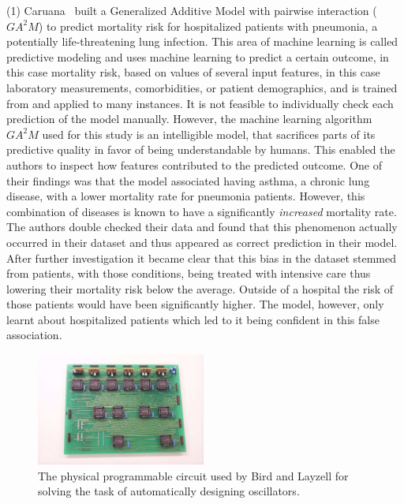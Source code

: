 \par \noindent (1)
Caruana~\etal\cite{Caruana:2015:IMH:2783258.2788613} built a Generalized Additive Model with pairwise interaction ($GA^2M$) to predict mortality risk for hospitalized patients with pneumonia, a potentially life-threatening lung infection. This area of machine learning is called predictive modeling and uses machine learning to predict a certain outcome, in this case mortality risk, based on values of several input features, in this case laboratory measurements, comorbidities, or patient demographics, and is trained from and applied to many instances. It is not feasible to individually check each prediction of the model manually. However, the machine learning algorithm $GA^2M$ used for this study is an intelligible model, that sacrifices parts of its predictive quality in favor of being understandable by humans. This enabled the authors to inspect how features contributed to the predicted outcome. One of their findings was that the model associated having asthma, a chronic lung disease, with a lower mortality rate for pneumonia patients. However, this combination of diseases is known to have a significantly \emph{increased} mortality rate. The authors double checked their data and found that this phenomenon actually occurred in their dataset and thus appeared as correct prediction in their model. After further investigation it became clear that this bias in the dataset stemmed from patients, with those conditions, being treated with intensive care thus lowering their mortality risk below the average. Outside of a hospital the risk of those patients would have been significantly higher. The model, however, only learnt about hospitalized patients which led to it being confident in this false association.

\begin{figure}
\centering
\includegraphics[height=10em]{tex/introduction/emradio.png}
\caption[Programmable circuit to automatically design oscillators.]{
The physical programmable circuit used by Bird and Layzell \cite{Bird:2002:ERI:1251972.1252349} for solving the task of automatically designing oscillators.
}
\label{figs:emradio}
\end{figure}

